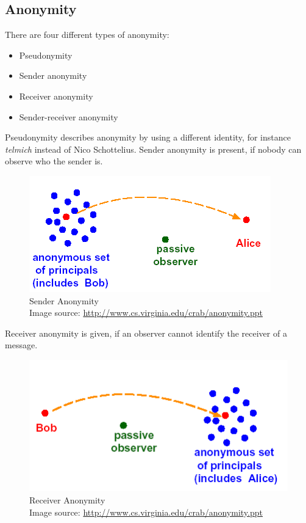 \subsection{Anonymity}
There are four different types of anonymity:
\begin{itemize}
\item Pseudonymity
\item Sender anonymity
\item Receiver anonymity
\item Sender-receiver anonymity
\end{itemize}
Pseudonymity describes anonymity by using a different identity, for instance
\textit{telmich} instead of Nico Schottelius.
Sender anonymity is present, if nobody can observe who the sender is.
\begin{figure}
    \centering
    \caption[Sender Anonymity]{Sender Anonymity\\Image source: \protect\url{http://www.cs.virginia.edu/crab/anonymity.ppt}}
    \label{senderanon}
    \includegraphics[scale=0.8]{sender-anon.png}
\end{figure}
Receiver anonymity is given, if an observer cannot identify  the receiver of
a message. 
\begin{figure}
    \centering
    \caption[Receiver Anonymity]{Receiver Anonymity\\Image source: \protect\url{http://www.cs.virginia.edu/crab/anonymity.ppt}}
    \label{receiveranon}
    \includegraphics[scale=0.8]{receiver-anon.png}
\end{figure}
